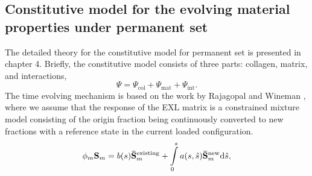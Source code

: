 \subsection{Constitutive model for the evolving material properties under permanent set}

    The detailed theory for the constitutive model for permanent set is presented in chapter 4. Briefly, the constitutive model consists of three parts: collagen, matrix, and interactions,
\begin{equation}
\Psi     = \Psi_\mathrm{col} + \Psi_\mathrm{mat} + \Psi_\mathrm{int} \label{c6:eqn:structuralmodelcomponents}. 
\end{equation}
    The time evolving mechanism is based on the work by Rajagopal and Wineman \cite{rajagopal_constitutive_1992}, where we assume that the response of the EXL matrix is a constrained mixture model consisting of the origin fraction being continuously converted to new fractions with a reference state in the current loaded configuration. 
\begin{equation} \label{c6:eq:wineman}
\phi_m \mathbf{S}_m = b(s)\mathbf{\bar{S}}_m^\mathrm{existing} + \int\displaylimits_0^s a(s,\hat{s})\mathbf{\bar{S}}_m^\mathrm{new} \mathrm{d}\hat{s},
\end{equation}

